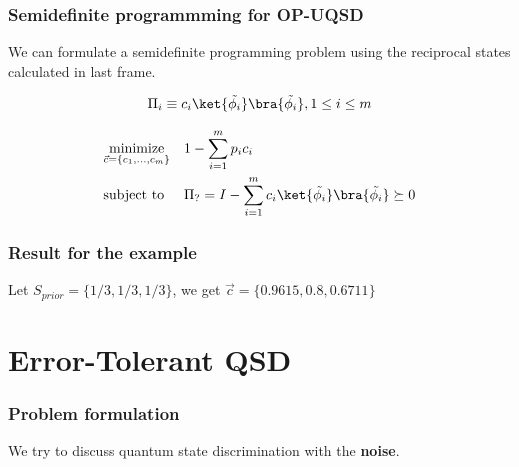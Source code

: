 \documentclass{beamer}
\begin{document}
\begin{frame}
    \frametitle{Semidefinite programmming for OP-UQSD}
    We can formulate a semidefinite programming problem using the reciprocal
    states calculated in last frame.

    \begin{align*}
        \Pi_{i} \equiv c_{i} \ket{ \tilde{\phi_{i}} } \bra{ \tilde{\phi_{i}} }, 1 \leq i \leq m
    \end{align*}

    \begin{align}
         & \underset{\vec{c}=\{c_{1}, \dots, c_{m}\}}{\text{minimize}} &  & 1 - \sum_{i=1}^{m} p_{i} c_{i}                                                                 \\
         & \text{subject to}                                           &  & \Pi_{?} = I - \sum_{i=1}^{m} c_{i} \ket{ \tilde{\phi_{i}} } \bra{ \tilde{\phi_{i}} } \succeq 0
    \end{align}

    \centering
    \begin{table}[ht]
        \caption{Probability matrix of the example}
    \end{table}
\end{frame}

\begin{frame}
    \frametitle{Result for the example}
    Let $S_{prior} = \{1/3, 1/3, 1/3\}$, we get $\vec{c} = \{0.9615, 0.8   , 0.6711\}$
\end{frame}

\section{Error-Tolerant QSD}

\begin{frame}
    \frametitle{Problem formulation}
    We try to discuss quantum state discrimination with the \textbf{noise}.
    \centering
    \scalebox{0.55}{}
\end{frame}
\end{document}
